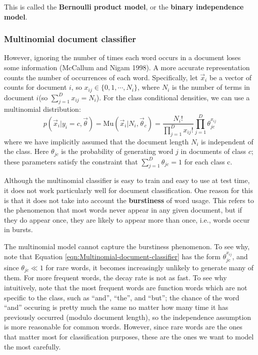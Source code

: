 \begin{refsection}
This is called the \textbf{Bernoulli product model}, or the \textbf{binary independence model}.

\subsubsection{Multinomial document classifier}
However, ignoring the number of times each word occurs in a document loses some information (McCallum and Nigam 1998). A more accurate representation counts the number of occurrences of each word. Specifically, let $\vec{x}_i$ be a vector of counts for document $i$, so $x_{ij} \in \{0,1,\cdots,N_i\}$, where $N_i$ is the number of terms in document $i$(so $\sum\limits_{j=1}^D x_{ij}=N_i$). For the class conditional densities, we can use a multinomial distribution:
\begin{equation}\label{eqn:Multinomial-document-classifier}
p(\vec{x}_i|y_i=c,\vec{\theta})=\text{Mu}(\vec{x}_i|N_i,\vec{\theta}_c)=\dfrac{N_i!}{\prod_{j=1}^D x_{ij}!}\prod\limits_{j=1}^D \theta_{jc}^{x_{ij}}
\end{equation}
where we have implicitly assumed that the document length $N_i$ is independent of the class. Here $θ_{jc}$ is the probability of generating word $j$ in documents of class $c$; these parameters satisfy the constraint that $\sum_{j=1}^D \theta_{jc}=1$ for each class c.

Although the multinomial classifier is easy to train and easy to use at test time, it does not work particularly well for document classification. One reason for this is that it does not take into account the \textbf{burstiness} of word usage. This refers to the phenomenon that most words never appear in any given document, but if they do appear once, they are likely to appear more than once, i.e., words occur in bursts.

The multinomial model cannot capture the burstiness phenomenon. To see why, note that Equation \ref{eqn:Multinomial-document-classifier} has the form $\theta_{jc}^{x_{ij}}$, and since $\theta_{jc} \ll 1$ for rare words, it becomes increasingly unlikely to generate many of them. For more frequent words, the decay rate is not as fast. To see why intuitively, note that the most frequent words are function words which are not specific to the class, such as “and”, “the”, and “but”; the chance of the word “and” occuring is pretty much the same no matter how many time it has previously occurred (modulo document length), so the independence assumption is more reasonable for common words. However, since rare words are the ones that matter most for classification purposes, these are the ones we want to model the most carefully.


\end{refsection}
